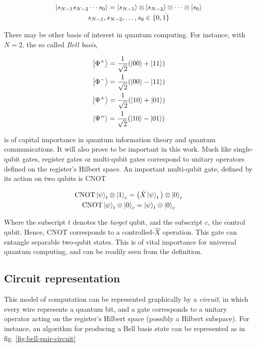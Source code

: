     \begin{gather}
      \ket{s_{N-1}s_{N-2} \cdots s_0} = \ket{s_{N-1}} \otimes \ket{s_{N-2}}\otimes \cdots \otimes \ket{s_{0}} \\
      s_{N-1}, s_{N-2}, \ldots, s_0 \in \{0,1\}
      \label{eq:multi-qubit-basis}
    \end{gather}

    There may be other basis of interest in quantum computing. For instance, with $N=2$, the so called \textit{Bell basis},

    \begin{gather}
      \ket{\Phi^{+}} = \frac{1}{\sqrt{2}}(\ket{00} + \ket{11})\\
      \ket{\Phi^{-}} = \frac{1}{\sqrt{2}}(\ket{00} - \ket{11})\\
      \ket{\Psi^{+}} = \frac{1}{\sqrt{2}}(\ket{10} + \ket{01})\\
      \ket{\Psi^{=}} = \frac{1}{\sqrt{2}}(\ket{10} - \ket{01})
      \label{eq:BellBasis}
    \end{gather}

    is of capital importance in quantum information theory and quantum communications. It will also prove to be important in this work. Much like single-qubit gates, register gates or multi-qubit gates correspond to unitary operators defined on the register's Hilbert space. An important multi-qubit gate, defined by its action on two qubits is CNOT

    \begin{gather}
      \text{CNOT}\ket{\psi}_t \otimes \ket{1}_c = \big(\hat{X}\ket{\psi}_t\big) \otimes \ket{0}_c\\
      \text{CNOT}\ket{\psi}_t \otimes \ket{0}_c = \ket{\psi}_t \otimes \ket{0}_c
      \label{eq:cnot-gate}
    \end{gather}

    Where the subscript $t$ denotes the \textit{target} qubit, and the subscript $c$, the control qubit. Hence, CNOT corresponds to a controlled-$\hat{X}$ operation. This gate can entangle separable two-qubit states. This is of vital importance for universal quantum computing, and can be readily seen from the definition.

  \subsection{Circuit representation}

    This model of computation can be represented graphically by a \textit{circuit}, in which every wire represents a quantum bit, and a gate corresponds to a unitary operator acting on the register's Hilbert space (possibly a Hilbert subspace). For instance, an algorithm for producing a Bell basis state can be represented as in fig. \ref{fig:bell-pair-circuit}

